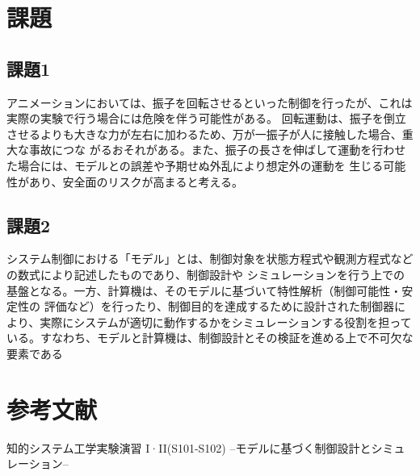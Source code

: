 \documentclass[10pt,a4paper,titlepage]{jreport} %
\begin{document}
\chapter{課題}

\section{課題1}

アニメーションにおいては、振子を回転させるといった制御を行ったが、これは実際の実験で行う場合には危険を伴う可能性がある。
回転運動は、振子を倒立させるよりも大きな力が左右に加わるため、万が一振子が人に接触した場合、重大な事故につな
がるおそれがある。また、振子の長さを伸ばして運動を行わせた場合には、モデルとの誤差や予期せぬ外乱により想定外の運動を
生じる可能性があり、安全面のリスクが高まると考える。

\section{課題2}

システム制御における「モデル」とは、制御対象を状態方程式や観測方程式などの数式により記述したものであり、制御設計や
シミュレーションを行う上での基盤となる。一方、計算機は、そのモデルに基づいて特性解析（制御可能性・安定性の
評価など）を行ったり、制御目的を達成するために設計された制御器により、実際にシステムが適切に動作するかをシミュレーションする役割を担っている。すなわち、モデルと計算機は、制御設計とその検証を進める上で不可欠な要素である

\chapter{参考文献}

知的システム工学実験演習 I·II(S101-S102)
–モデルに基づく制御設計とシミュレーション– 
\end{document}
